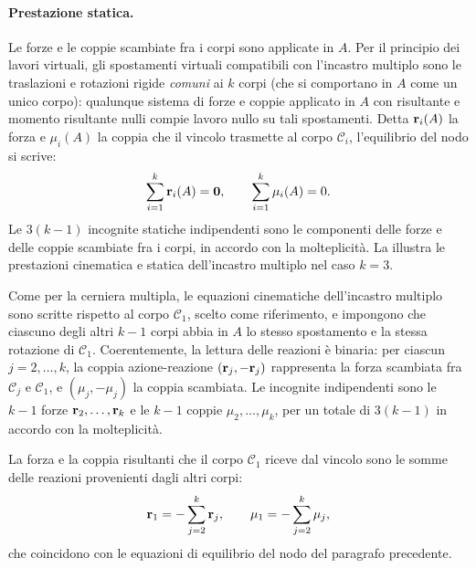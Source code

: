 \paragraph{Prestazione statica.}
Le forze e le coppie scambiate fra i corpi sono applicate
in $A$. Per il principio dei lavori virtuali, gli spostamenti
virtuali compatibili con l'incastro multiplo sono le
traslazioni e rotazioni rigide \emph{comuni} ai $k$ corpi
(che si comportano in $A$ come un unico corpo): qualunque
sistema di forze e coppie applicato in $A$ con risultante
e momento risultante nulli compie lavoro nullo su tali
spostamenti. Detta $\mathbf{r}_i(A)$ la forza e $\mu_i(A)$ la
coppia che il vincolo trasmette al corpo $\mathcal{C}_i$,
l'equilibrio del nodo si scrive:
\begin{equation}
	\sum_{i=1}^{k} \mathbf{r}_i(A) = \mathbf{0},
	\qquad
	\sum_{i=1}^{k} \mu_i(A) = 0.
\end{equation}
Le $3(k-1)$ incognite statiche indipendenti sono le
componenti delle forze e delle coppie scambiate fra i
corpi, in accordo con la molteplicità. La
 illustra le prestazioni
cinematica e statica dell'incastro multiplo nel caso
$k = 3$.

\begin{oss}
	Come per la cerniera multipla, le equazioni cinematiche
	dell'incastro multiplo sono scritte rispetto al corpo
	$\mathcal{C}_1$, scelto come riferimento, e impongono
	che ciascuno degli altri $k-1$ corpi abbia in $A$ lo
	stesso spostamento e la stessa rotazione di
	$\mathcal{C}_1$. Coerentemente, la lettura delle
	reazioni è binaria: per ciascun $j = 2, \ldots, k$, la
	coppia azione-reazione $(\mathbf{r}_j, -\mathbf{r}_j)$ rappresenta la
	forza scambiata fra $\mathcal{C}_j$ e $\mathcal{C}_1$,
	e $(\mu_j, -\mu_j)$ la coppia scambiata. Le incognite
	indipendenti sono le $k-1$ forze $\mathbf{r}_2, \ldots, \mathbf{r}_k$
	e le $k-1$ coppie $\mu_2, \ldots, \mu_k$, per un totale
	di $3(k-1)$ in accordo con la molteplicità.
	
	La forza e la coppia risultanti che il corpo
	$\mathcal{C}_1$ riceve dal vincolo sono le somme delle
	reazioni provenienti dagli altri corpi:
	\begin{equation}\label{eq:incastro_multiplo_r1_mu1}
		\mathbf{r}_1 = -\sum_{j=2}^{k} \mathbf{r}_j,
		\qquad
		\mu_1 = -\sum_{j=2}^{k} \mu_j,
	\end{equation}
	che coincidono con le equazioni di equilibrio del nodo
	del paragrafo precedente.
\end{oss}


